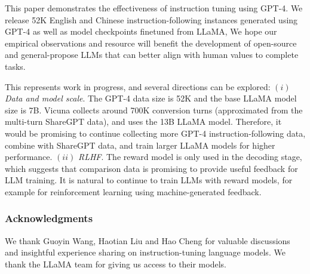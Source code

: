 This paper demonstrates the effectiveness of instruction tuning using GPT-4. We release 52K English and Chinese instruction-following instances generated using GPT-4 as well as model checkpoints finetuned from LLaMA, We hope our empirical observations and resource will benefit the development of open-source and general-propose LLMs that can better align with human values to complete tasks. 

This represents work in progress, and several directions can be explored: $(i)$ {\it Data and model scale}. The GPT-4 data size is 52K and the base LLaMA model size is 7B. Vicuna collects around 700K conversion turns (approximated from the multi-turn ShareGPT data), and uses the 13B LLaMA model. Therefore, it would be promising to continue collecting more GPT-4 instruction-following data, combine with ShareGPT data, and train larger LLaMA models for higher performance. $(ii)$ {\it RLHF}. The reward model is only used in the decoding stage, which suggests that comparison data is promising to provide useful feedback for LLM training. It is natural to continue to train LLMs with reward models, for example for reinforcement learning using machine-generated feedback.

\subsubsection*{Acknowledgments}
We thank Guoyin Wang, Haotian Liu and Hao Cheng for valuable discussions and insightful experience sharing on instruction-tuning language models. We thank the LLaMA team for giving us access to their models.


